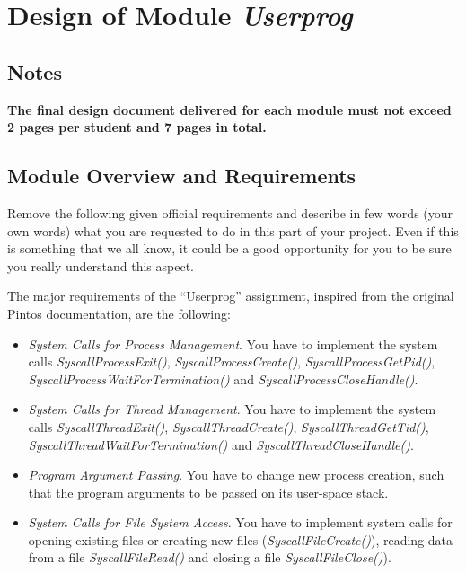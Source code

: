 
\chapter{Design of Module \textit{Userprog}}

\renewcommand{\taskA}{\textit{Program Argument Passing}}
\renewcommand{\taskB}{\textit{System Calls for Process and Thead Management}}
\renewcommand{\taskC}{\textit{System Calls for Filesystem Access}}

\section*{Notes}

\textbf{The final design document delivered for each module must not exceed 2 pages per student and 7 pages in total.}

\section{Module Overview and Requirements}

Remove the following given official requirements and describe in few words (your own words) what you are requested to do in this part of your project. Even if this is something that we all know, it could be a good opportunity for you to be sure you really understand this aspect. 

The major requirements of the ``Userprog'' assignment, inspired from the original Pintos documentation, are the following:
\begin{itemize}
    \item \textit{System Calls for Process Management}. You have to implement the system calls \textit{SyscallProcessExit()}, \textit{SyscallProcessCreate()}, \textit{SyscallProcessGetPid()}, \textit{SyscallProcessWaitForTermination()} and \textit{SyscallProcessCloseHandle()}.

    \item \textit{System Calls for Thread Management}. You have to implement the system calls \textit{SyscallThreadExit()}, \textit{SyscallThreadCreate()}, \textit{SyscallThreadGetTid()}, \textit{SyscallThreadWaitForTermination()} and \textit{SyscallThreadCloseHandle()}.

    \item \textit{Program Argument Passing}. You have to change new process creation, such that the program arguments to be passed on its user-space stack.
    
    \item \textit{System Calls for File System Access}. You have to implement system calls for opening existing files or creating new files (\textit{SyscallFileCreate()}), reading data from a file \textit{SyscallFileRead()} and closing a file \textit{SyscallFileClose()}).
\end{itemize}

